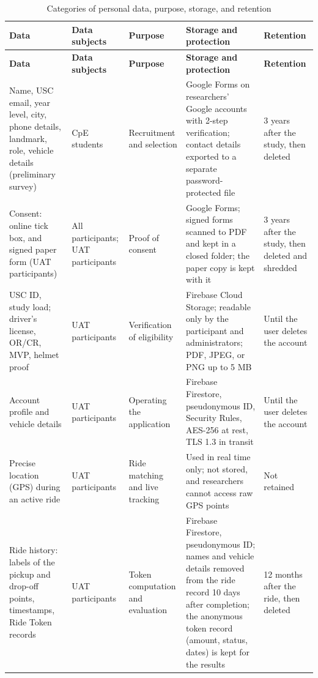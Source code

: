 \begin{footnotesize}
\begin{longtable}{p{}p{}p{}p{}p{}}
\caption[Categories of personal data, purpose, storage, and retention]{Categories of personal data, purpose, storage, and retention}\label{tab:data}\\
\hline
\textbf{Data} & \textbf{Data subjects} & \textbf{Purpose} & \textbf{Storage and protection} & \textbf{Retention} \\ \hline
\endfirsthead
\hline
\textbf{Data} & \textbf{Data subjects} & \textbf{Purpose} & \textbf{Storage and protection} & \textbf{Retention} \\ \hline
\endhead
Name, USC email, year level, city, phone details, landmark, role, vehicle details (preliminary survey) & CpE students & Recruitment and selection & Google Forms on researchers' Google accounts with 2-step verification; contact details exported to a separate password-protected file & 3 years after the study, then deleted \\ \hline
Consent: online tick box, and signed paper form (UAT participants) & All participants; UAT participants & Proof of consent & Google Forms; signed forms scanned to PDF and kept in a closed folder; the paper copy is kept with it & 3 years after the study, then deleted and shredded \\ \hline
USC ID, study load; driver's license, OR/CR, MVP, helmet proof & UAT participants & Verification of eligibility & Firebase Cloud Storage; readable only by the participant and administrators; PDF, JPEG, or PNG up to 5 MB & Until the user deletes the account \\ \hline
Account profile and vehicle details & UAT participants & Operating the application & Firebase Firestore, pseudonymous ID, Security Rules, AES-256 at rest, TLS 1.3 in transit & Until the user deletes the account \\ \hline
Precise location (GPS) during an active ride & UAT participants & Ride matching and live tracking & Used in real time only; not stored, and researchers cannot access raw GPS points & Not retained \\ \hline
Ride history: labels of the pickup and drop-off points, timestamps, Ride Token records & UAT participants & Token computation and evaluation & Firebase Firestore, pseudonymous ID; names and vehicle details removed from the ride record 10 days after completion; the anonymous token record (amount, status, dates) is kept for the results & 12 months after the ride, then deleted \\ \hline

\end{longtable}
\end{footnotesize}

